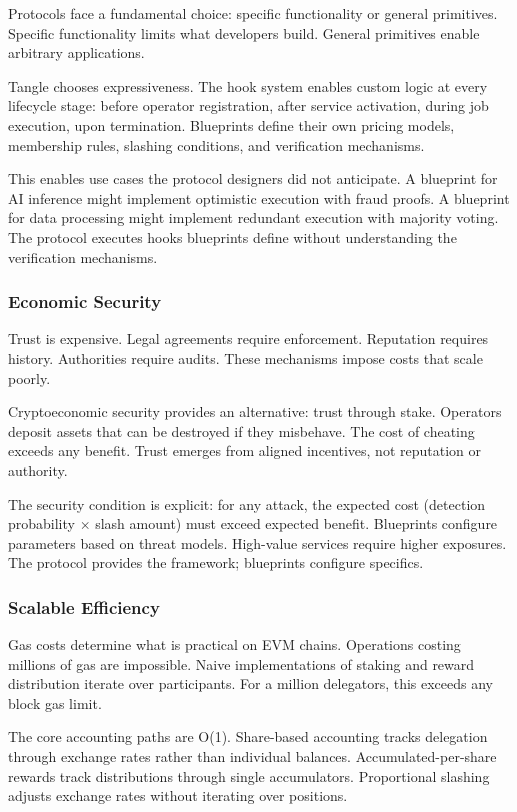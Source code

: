 \documentclass[11pt,a4paper]{article}
\begin{document}
Protocols face a fundamental choice: specific functionality or general primitives. Specific functionality limits what developers build. General primitives enable arbitrary applications.

Tangle chooses expressiveness. The hook system enables custom logic at every lifecycle stage: before operator registration, after service activation, during job execution, upon termination. Blueprints define their own pricing models, membership rules, slashing conditions, and verification mechanisms.

This enables use cases the protocol designers did not anticipate. A blueprint for AI inference might implement optimistic execution with fraud proofs. A blueprint for data processing might implement redundant execution with majority voting. The protocol executes hooks blueprints define without understanding the verification mechanisms.

\subsubsection{Economic Security}

Trust is expensive. Legal agreements require enforcement. Reputation requires history. Authorities require audits. These mechanisms impose costs that scale poorly.

Cryptoeconomic security provides an alternative: trust through stake. Operators deposit assets that can be destroyed if they misbehave. The cost of cheating exceeds any benefit. Trust emerges from aligned incentives, not reputation or authority.

The security condition is explicit: for any attack, the expected cost (detection probability $\times$ slash amount) must exceed expected benefit. Blueprints configure parameters based on threat models. High-value services require higher exposures. The protocol provides the framework; blueprints configure specifics.

\subsubsection{Scalable Efficiency}

Gas costs determine what is practical on EVM chains. Operations costing millions of gas are impossible. Naive implementations of staking and reward distribution iterate over participants. For a million delegators, this exceeds any block gas limit.

The core accounting paths are O(1). Share-based accounting tracks delegation through exchange rates rather than individual balances. Accumulated-per-share rewards track distributions through single accumulators. Proportional slashing adjusts exchange rates without iterating over positions.
\end{document}
